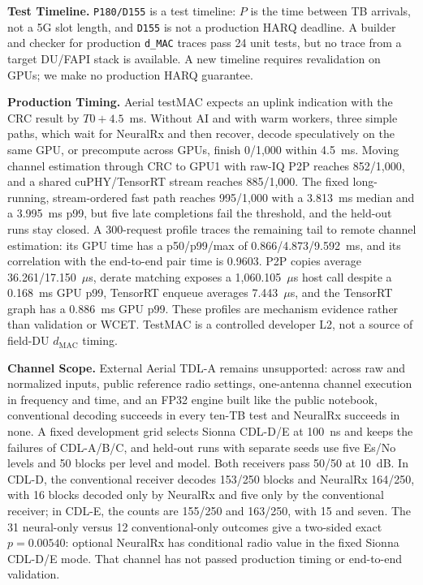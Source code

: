 \documentclass[acmsmall,screen,review,anonymous]{acmart}
\newcommand{\NRx}{NeuralRx\xspace}
\begin{document}
\noindent\textbf{Test Timeline.}
\texttt{P180/D155} is a test timeline: $P$ is the time between TB arrivals, not a 5G slot length, and
\texttt{D155} is not a production HARQ deadline. A builder and checker for production \texttt{d\_MAC}
traces pass 24 unit tests, but no trace from a target DU/FAPI stack is available. A new timeline requires
revalidation on GPUs; we make no production HARQ guarantee.

\noindent\textbf{Production Timing.}
Aerial testMAC expects an uplink indication with the CRC result by $T0+4.5$~ms. Without AI and with warm
workers, three simple paths, which wait for \NRx and then recover, decode speculatively on the same GPU,
or precompute across GPUs, finish 0/1,000 within 4.5~ms. Moving channel estimation through CRC to GPU1 with
raw-IQ P2P reaches 852/1,000, and a shared cuPHY/TensorRT stream reaches 885/1,000. The fixed long-running,
stream-ordered fast path reaches 995/1,000 with a 3.813~ms median and a 3.995~ms p99, but five late
completions fail the threshold, and the held-out runs stay closed. A 300-request profile traces the
remaining tail to remote channel estimation: its GPU time has a p50/p99/max of 0.866/4.873/9.592~ms, and
its correlation with the end-to-end pair time is 0.9603. P2P copies average 36.261/17.150~$\mu$s, derate
matching exposes a 1,060.105~$\mu$s host call despite a 0.168~ms GPU p99, TensorRT enqueue averages
7.443~$\mu$s, and the TensorRT graph has a 0.886~ms GPU p99. These profiles are mechanism evidence rather
than validation or WCET. TestMAC is a controlled developer L2, not a source of field-DU $d_{\mathrm{MAC}}$
timing.

\noindent\textbf{Channel Scope.}
External Aerial TDL-A remains unsupported: across raw and normalized inputs, public reference radio
settings, one-antenna channel execution in frequency and time, and an FP32 engine built like the public
notebook, conventional decoding succeeds in every ten-TB test and \NRx succeeds in none. A fixed
development grid selects Sionna CDL-D/E at 100~ns and keeps the failures of CDL-A/B/C, and held-out runs
with separate seeds use five Es/No levels and 50 blocks per level and model. Both receivers pass 50/50 at
10~dB. In CDL-D, the conventional receiver decodes 153/250 blocks and \NRx 164/250, with 16 blocks decoded
only by \NRx and five only by the conventional receiver; in CDL-E, the counts are 155/250 and 163/250, with
15 and seven. The 31 neural-only versus 12 conventional-only outcomes give a two-sided exact $p=0.00540$:
optional \NRx has conditional radio value in the fixed Sionna CDL-D/E mode. That channel has not passed
production timing or end-to-end validation.
\end{document}

